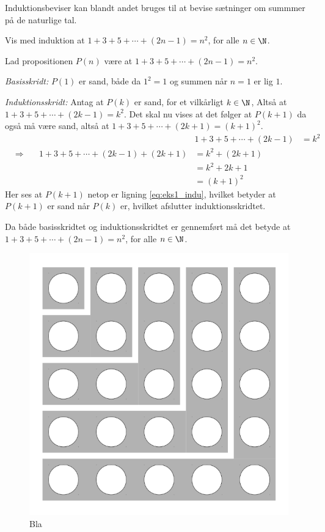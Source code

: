 Induktionsbeviser kan blandt andet bruges til at bevise sætninger om summmer på de naturlige tal.
\begin{exmp}
	Vis med induktion at $1 + 3 + 5 + \dotsb + (2n-1) = n^2$, for alle $n \in \N$.

	Lad propositionen $P(n)$ være at $1 + 3 + 5 + \dotsb + (2n-1) = n^2$.
	
	\textit{Basisskridt:} $P(1)$ er sand, både da $1^2 = 1$ og summen når $n = 1$ er lig $1$.

	\textit{Induktionsskridt:} Antag at $P(k)$ er sand, for et vilkårligt $k \in \N$, Altså at $1 + 3 + 5 + \dotsb + (2k-1) = k^2$.
	Det skal nu vises at det følger at $P(k + 1)$ da også må være sand, altså at $1 + 3 + 5 + \dotsb + (2k+1) = \left( k + 1 \right) ^2$.
	\begin{alignat}
		&&&1 + 3 + 5 + \dotsb + (2k-1) 
		&= k^2 \nonumber \\
		&\Rightarrow \quad
		&1 + 3 + 5 + \dotsb + (2k-1) + (2k+1) 
		&= k^2 + (2k + 1) \nonumber \\
		&&&= k^2 + 2k + 1 \nonumber \\
		&&&= \left( k + 1 \right) ^2 \label{eq:eks1_indu}
	\end{alignat}
	Her ses at $P(k + 1)$ netop er ligning \eqref{eq:eks1_indu}, hvilket betyder at $P(k + 1)$ er sand når $P(k)$ er, hvilket afslutter induktionsskridtet.

	Da både basisskridtet og induktionsskridtet er gennemført må det betyde at $1 + 3 + 5 + \dotsb + (2n-1) = n^2$, for alle $n \in \N$.
\end{exmp}

\begin{figure}
	\begin{center}
		\includegraphics[scale=0.2]{fig/img/sum_of_n_first_odd_integers.png}
	\end{center}
	\caption{Bla} \label{fig1_indu}
\end{figure}


